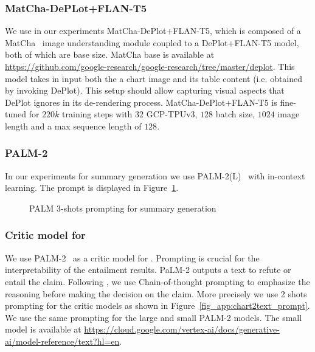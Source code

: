 \subsubsection{MatCha-DePLot+FLAN-T5}
We use in our experiments MatCha-DePlot+FLAN-T5, which is composed of a MatCha~\cite{liu-etal-2023-matcha} image understanding module coupled to a DePlot+FLAN-T5 model, both of which are base size. MatCha base is available at
\url{https://github.com/google-research/google-research/tree/master/deplot}. This model takes in input both the a chart image and its table content (i.e. obtained by invoking DePlot). This setup should allow capturing visual aspects that DePlot ignores in its de-rendering process. MatCha-DePlot+FLAN-T5 is fine-tuned for $220k$ training steps with $32$ GCP-TPUv3, $128$ batch size, $1024$ image length and a max sequence length of $128$.

\subsubsection{PALM-2}
\label{app:LLM-prompting}
In our experiments for summary generation we use PALM-2(L)~\cite{anil2023palm} with in-context learning. The prompt is displayed in Figure~\ref{fig_app:summary_gen_prompt}.

\begin{figure}
    \centering
    
    \caption{PALM 3-shots prompting for summary generation}
    \label{fig_app:summary_gen_prompt}
\end{figure}

\subsubsection{Critic model for \metric{}}
\label{app:prompting}
We use PALM-2~\cite{anil2023palm} as a critic model for \metric{}. Prompting is crucial for the interpretability of the entailment results. PaLM-2 outputs a text to refute or entail the claim. Following \citet{wei2022chain}, we use Chain-of-thought prompting to emphasize the reasoning before making the decision on the claim. More precisely we use 2 shots prompting for the critic models as shown in Figure~\ref{fig_app:chart2text_prompt}.
We use the same prompting for the large and small PALM-2 models.
The small model is available at \url{https://cloud.google.com/vertex-ai/docs/generative-ai/model-reference/text?hl=en}.


